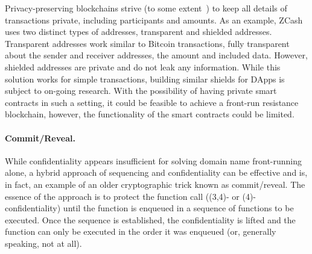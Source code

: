 

Privacy-preserving blockchains strive (to some extent~\cite{miller2017empirical,kappos2018empirical}) to keep all details of transactions private, including participants and amounts. As an example, ZCash~\cite{hopwood2016zcash} uses two distinct types of addresses, transparent and shielded addresses. Transparent addresses work similar to Bitcoin transactions, fully transparent about the sender and receiver addresses, the amount and included data. However, shielded addresses are private and do not leak any information. While this solution works for simple transactions, building similar shields for DApps is subject to on-going research. With the possibility of having private smart contracts in such a setting, it could be feasible to achieve a front-run resistance blockchain, however, the functionality of the smart contracts could be limited.


\paragraph{Commit/Reveal.}
\label{sec:comm}

While confidentiality appears insufficient for solving domain name front-running alone, a hybrid approach of sequencing and confidentiality can be effective and is, in fact, an example of an older cryptographic trick known as commit/reveal. The essence of the approach is to protect the function call (\eg (3,4)- or (4)-confidentiality) until the function is enqueued in a sequence of functions to be executed. Once the sequence is established, the confidentiality is lifted and the function can only be executed in the order it was enqueued (or, generally speaking, not at all).


